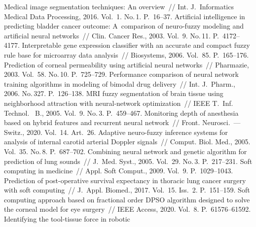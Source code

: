 \begin{multicols}{2}
{{\begin{thebibliography}{99}
 Medical image segmentation techniques: An overview~// Int. 
J.~Informatics Medical Data Processing, 2016. Vol.~1. No.\,1. P.~16--37.
Artificial intelligence in predicting bladder cancer outcome: A~comparison of neuro-fuzzy modeling 
and artificial neural networks~// Clin. Cancer Res., 2003. Vol.~9. No.\,11. P.~4172--4177.
 Interpretable gene expression classifier with 
an accurate and compact fuzzy rule base for microarray data analysis~// Biosystems, 2006. Vol.~85. 
P.~165--176.
 Prediction of corneal permeability using 
artificial neural networks~// Pharmazie, 2003. Vol.~58. No.\,10. P.~725--729.
Performance comparison of neural network training algorithms in modeling of bimodal drug 
delivery~// Int. J.~Pharm., 2006. No.\,327. P.~126--138.
 MRI fuzzy segmentation of brain tissue using 
neighborhood attraction with neural-network optimization~// IEEE T.~Inf. 
Technol.~ B., 2005. Vol.~9. No.\,3. P.~459--467.
 Monitoring depth of anesthesia based on hybrid 
features and recurrent neural network~// Front. Neurosci.~--- Switz., 2020. Vol.~14. Art.~26.
 Adaptive neuro-fuzzy inference systems for analysis of internal carotid 
arterial Doppler signals~// Comput. Biol. Med., 2005. Vol.~35. No.\,8. P.~687--702.
 Combining neural network and genetic algorithm for prediction 
of lung sounds~// J.~Med. Syst., 2005. Vol.~29. No.\,3. P.~217--231.
 Soft computing in medicine~// Appl. Soft Comput., 2009. Vol.~9. P.~1029--1043.
 Prediction of post-operative survival expectancy in thoracic lung cancer surgery 
with soft computing~// J.~Appl. Biomed., 2017. Vol.~15. Iss.~2. P.~151--159.
 Soft computing approach based on 
fractional order DPSO algorithm designed to solve the corneal model for eye surgery~// IEEE 
Access, 2020. Vol.~8. P.~61576--61592.
 Identifying the tool-tissue force in robotic 

\end{thebibliography}}}
\end{multicols}
